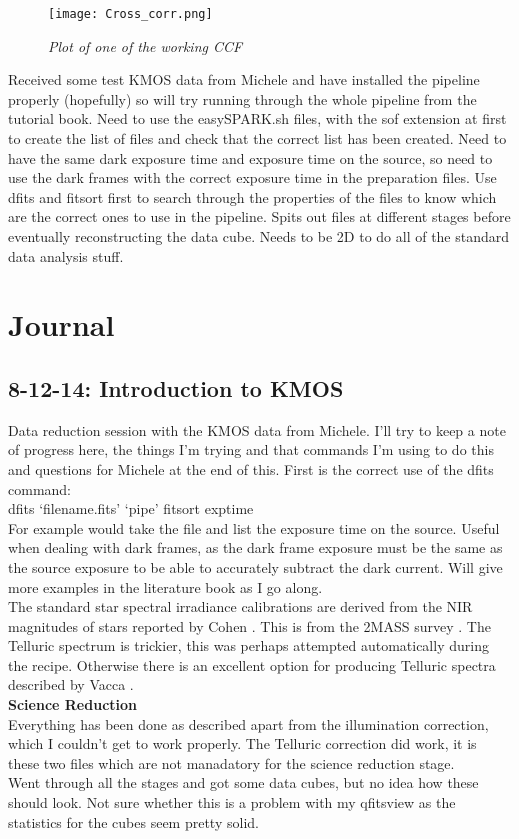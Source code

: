 \documentclass{literature}
\begin{document}
\begin{figure}[!htp]
\centering
\texttt{[image: Cross\_corr.png]}
\caption{\footnotesize{\emph{Plot of one of the working CCF}}}
\label{fig:cross_cor}
\end{figure}

Received some test KMOS data from Michele and have installed the pipeline properly (hopefully) so will try running through the whole pipeline from the tutorial book. Need to use the easySPARK.sh files, with the sof extension at first to create the list of files and check that the correct list has been created. Need to have the same dark exposure time and exposure time on the source, so need to use the dark frames with the correct exposure time in the preparation files. Use dfits and fitsort first to search through the properties of the files to know which are the correct ones to use in the pipeline. Spits out files at different stages before eventually reconstructing the data cube. Needs to be 2D to do all of the standard data analysis stuff.




\section{Journal}
\subsection{8-12-14: Introduction to KMOS}
Data reduction session with the KMOS data from Michele. I'll try to keep a note of progress here, the things I'm trying and that commands I'm using to do this and questions for Michele at the end of this. First is the correct use of the dfits command: \\

dfits `filename.fits' `pipe' fitsort exptime \\ 

For example would take the file and list the exposure time on the source. Useful when dealing with dark frames, as the dark frame exposure must be the same as the source exposure to be able to accurately subtract the dark current. Will give more examples in the literature book as I go along. \\ 
The standard star spectral irradiance calibrations are derived from the NIR magnitudes of stars reported by Cohen \citep{Cohen_2003}. This is from the 2MASS survey \citep{Skrutskie_2006}. The Telluric spectrum is trickier, this was perhaps attempted automatically during the recipe. Otherwise there is an excellent option for producing Telluric spectra described by Vacca \citep{Vacca_2003}. \\ 
\textbf{Science Reduction} \\ 
Everything has been done as described apart from the illumination correction, which I couldn't get to work properly. The Telluric correction did work, it is these two files which are not manadatory for the science reduction stage. \\ 
Went through all the stages and got some data cubes, but no idea how these should look. Not sure whether this is a problem with my qfitsview as the statistics for the cubes seem pretty solid. 
\end{document}
